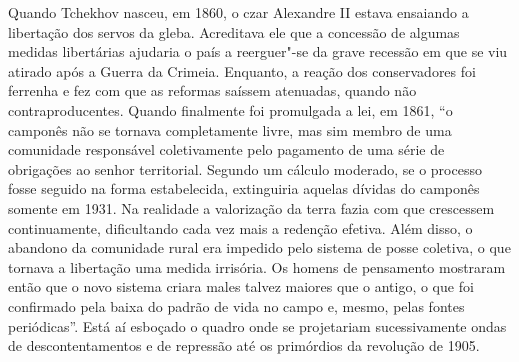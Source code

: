 Quando Tchekhov nasceu, em 1860, o czar Alexandre II estava ensaiando a
libertação dos servos da gleba. Acreditava ele que a concessão de
algumas medidas libertárias ajudaria o país a reerguer"-se da grave
recessão em que se viu atirado após a Guerra da Crimeia. Enquanto, a
reação dos conservadores foi ferrenha e fez com que as reformas saíssem
atenuadas, quando não contraproducentes. Quando finalmente foi
promulgada a lei, em 1861, ``o camponês não se tornava completamente
livre, mas sim membro de uma comunidade responsável coletivamente pelo
pagamento de uma série de obrigações ao senhor territorial. Segundo um
cálculo moderado, se o processo fosse seguido na forma estabelecida,
extinguiria aquelas dívidas do camponês somente em 1931. Na realidade a
valorização da terra fazia com que crescessem continuamente,
dificultando cada vez mais a redenção efetiva. Além disso, o abandono da
comunidade rural era impedido pelo sistema de posse coletiva, o que
tornava a libertação uma medida irrisória. Os homens de pensamento
mostraram então que o novo sistema criara males talvez maiores que o
antigo, o que foi confirmado pela baixa do padrão de vida no campo e,
mesmo, pelas fontes periódicas''. Está aí esboçado o quadro onde se
projetariam sucessivamente ondas de descontentamentos e de repressão até
os primórdios da revolução de 1905.

